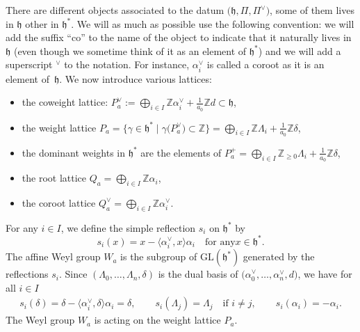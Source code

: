 \documentclass[pdftex]{sigma}
\numberwithin{equation}{section}
\newcommand{\al}{\alpha}
\newcommand{\ga}{\gamma}
\newcommand{\La}{\Lambda}
\newcommand{\fh}{\mathfrak{h}}
\newcommand{\Z}{\mathbb{Z}}
\begin{document}
There are different objects associated to the datum $\bigl(\fh,\Pi,\Pi^\vee\bigr)$, some of them lives in $\fh$ other in $\fh^\ast$. We will as much as possible use the following convention: we will add the suffix ``co'' to the name of the object to indicate that it naturally lives in $\fh$ (even though we sometime think of it as an element of $\fh^\ast$) and we will add a superscript $^\vee$ to the notation. For instance, $\al_i^\vee$ is called a coroot as it is an element of~$\fh$. We now introduce various lattices:
\begin{itemize}
\item  the coweight lattice: $P_a^\vee := \bigoplus_{i\in I} \Z \al_i^\vee +\frac{1}{a_0}\Z d\subset \fh$,
\item  the weight lattice $P_a = \bigl\{\ga\in \fh^\ast\mid \ga\bigl(P_a^\vee\bigr) \subset \Z\bigr\} = \bigoplus_{i\in I} \Z\La_i +\frac{1}{a_0} \Z\delta$,
 \item  the dominant weights in $\fh^\ast$ are the elements of $P^+_a = \bigoplus_{i\in I} \Z_{\geq 0}\La_i +\frac{1}{a_0} \Z\delta$,
\item  the root lattice $Q_a=\bigoplus_{i\in I} \Z \al_i$,
\item  the coroot lattice $Q_a^\vee=\bigoplus_{i\in I} \Z \al^\vee_i$.
\end{itemize}
For any $i\in I$, we define the simple reflection $s_{i}$ on $\fh^\ast$ by
\begin{equation*}
s_{i}(x)=x-\bigl\langle\alpha_{i}^{\vee},x\bigr\rangle\alpha_{i}\quad \text{for any
}x\in \fh^\ast . \label{defSi}
\end{equation*}
The affine Weyl group $W_{a}$ is the subgroup of $\mathrm{GL}(\mathfrak{h}^{\ast})$ generated
by the reflections $s_{i}$. Since $(\La_0,\dots,\La_n,\delta)$ is the dual basis of $\bigl(\al_0^\vee,\dots,\al_n^\vee,d\bigr)$, we have for all $i\in I$
\begin{align*}
s_i(\delta)=\delta - \bigl\langle\alpha_{i}^{\vee},\delta\bigr\rangle \al_i = \delta,\qquad
s_i(\La_j)= \La_j \quad\text{if $i\neq j$},\qquad
s_i(\al_i)= -\al_i.
\end{align*}
The Weyl group $W_a$ is acting on the weight
lattice $P_{a}$.
\end{document}
